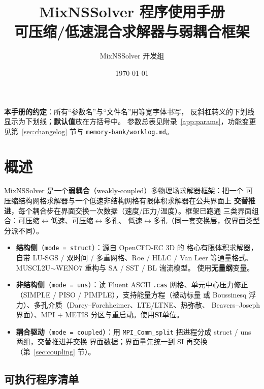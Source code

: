 \documentclass[11pt,a4paper]{ctexart}
\title{\bfseries MixNSSolver 程序使用手册\\[6pt]
\large 可压缩/低速混合求解器与弱耦合框架}
\author{MixNSSolver 开发组}
\date{\today}
\begin{document}
\maketitle
\thispagestyle{empty}
\vspace{1em}
\noindent\textbf{本手册的约定}：所有``参数名''与``文件名''用等宽字体书写，
反斜杠转义的下划线显示为下划线；\textbf{默认值}放在方括号中。
参数总表见附录~\ref{app:params}，功能变更见第~\ref{sec:changelog} 节与
\texttt{memory-bank/worklog.md}。

\tableofcontents
\newpage

\section{概述}\label{sec:overview}

MixNSSolver 是一个\textbf{弱耦合}（weakly-coupled）多物理场求解器框架：把一个
可压缩结构网格求解器与一个低速非结构网格有限体积求解器在公共界面上
\textbf{交替推进}，每个耦合步在界面交换一次数据（速度/压力/温度）。框架已跑通
三类界面组合：可压缩$\leftrightarrow$低速、可压缩$\leftrightarrow$多孔、
低速$\leftrightarrow$多孔（同一套交换层，仅界面类型分派不同）。

\begin{itemize}\itemsep3pt
  \item \textbf{结构侧}（\texttt{mode = struct}）：源自 OpenCFD-EC 3D 的
        格心有限体积求解器，自带 LU-SGS / 双时间 / 多重网格、Roe / HLLC /
        Van Leer 等通量格式、MUSCL2U$\sim$WENO7 重构与 SA / SST / BL 湍流模型。
        使用\textbf{无量纲}变量。
  \item \textbf{非结构侧}（\texttt{mode = uns}）：读 Fluent ASCII \texttt{.cas}
        网格、单元中心压力修正（SIMPLE / PISO / PIMPLE），支持能量方程（被动标量
        或 Boussinesq 浮力）、多孔介质（Darcy--Forchheimer、LTE/LTNE、热弥散、
        Beavers--Joseph 界面）、MPI + METIS 分区与重启动。使用\textbf{SI}单位。
  \item \textbf{耦合驱动}（\texttt{mode = coupled}）：用
        \texttt{MPI\_Comm\_split} 把进程分成 struct / uns 两组，交替推进并交换
        界面数据；界面量先统一到 SI 再交换（第~\ref{sec:coupling} 节）。
\end{itemize}

\subsection{可执行程序清单}
\end{document}
